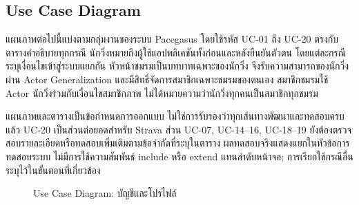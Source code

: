 \subsection{Use Case Diagram}
\label{sec:usecases-revised}

แผนภาพต่อไปนี้แบ่งตามกลุ่มงานของระบบ Pacegasus โดยใช้รหัส UC-01 ถึง UC-20 ตรงกับตารางคำอธิบายทุกกรณี นักวิ่งหมายถึงผู้ใช้แอปพลิเคชันทั้งก่อนและหลังยืนยันตัวตน โดยแต่ละกรณีระบุเงื่อนไขเข้าสู่ระบบแยกกัน หัวหน้าชมรมเป็นบทบาทเฉพาะของนักวิ่ง จึงรับความสามารถของนักวิ่งผ่าน Actor Generalization และมีสิทธิ์จัดการสมาชิกเฉพาะชมรมของตนเอง สมาชิกชมรมใช้ Actor นักวิ่งร่วมกับเงื่อนไขสมาชิกภาพ ไม่ได้หมายความว่านักวิ่งทุกคนเป็นสมาชิกทุกชมรม

แผนภาพและตารางเป็นข้อกำหนดการออกแบบ ไม่ใช่การรับรองว่าทุกเส้นทางพัฒนาและทดสอบครบแล้ว UC-20 เป็นส่วนต่อยอดสำหรับ Strava ส่วน UC-07, UC-14--16, UC-18--19 ยังต้องตรวจสอบรายละเอียดหรือทดสอบเพิ่มเติมตามข้อจำกัดที่ระบุในตาราง ผลทดสอบจริงแสดงแยกในหัวข้อการทดสอบระบบ ไม่มีการใช้ความสัมพันธ์ include หรือ extend แทนลำดับหน้าจอ; การเรียกใช้กรณีอื่นระบุไว้ในขั้นตอนที่เกี่ยวข้อง

\newcommand{\UCActor}[3]{%
\draw (#1,#2+0.3) circle (0.12);
\draw (#1,#2+0.18)--(#1,#2-0.22);
\draw (#1-0.22,#2)--(#1+0.22,#2);
\draw (#1,#2-0.22)--(#1-0.2,#2-0.5);
\draw (#1,#2-0.22)--(#1+0.2,#2-0.5);
\node[font=\small,align=center] at (#1,#2-0.8) {#3};}


\begin{figure}[H]\centering


\caption{Use Case Diagram: บัญชีและโปรไฟล์}\label{fig:usecase-group-1}

\end{figure}


